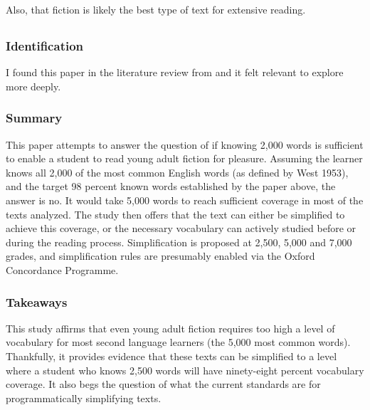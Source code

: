 \documentclass[
	letterpaper, %
]{jdf}
\begin{document}
Also, that fiction is likely the best type of text for extensive reading.
%
\subsection{}
\subsubsection{Identification}
I found this paper in the literature review from \cite{hu_2000} and it felt relevant to explore more deeply.

\subsubsection{Summary}
This paper attempts to answer the question of if knowing 2,000 words is sufficient to enable a student to read young adult fiction for pleasure. Assuming the learner knows all 2,000 of the most common English words (as defined by West 1953), and the target 98 percent known words established by the paper above, the answer is no. It would take 5,000 words to reach sufficient coverage in most of the texts analyzed. The study then offers that the text can either be simplified to achieve this coverage, or the necessary vocabulary can actively studied before or during the reading process. Simplification is proposed at 2,500, 5,000 and 7,000 grades, and simplification rules are presumably enabled via the Oxford Concordance Programme.

\subsubsection{Takeaways}
This study affirms that even young adult fiction requires too high a level of vocabulary for most second language learners (the 5,000 most common words). Thankfully, it provides evidence that these texts can be simplified to a level where a student who knows 2,500 words will have ninety-eight percent vocabulary coverage. It also begs the question of what the current standards are for programmatically simplifying texts.
%
\subsection{}
\end{document}
